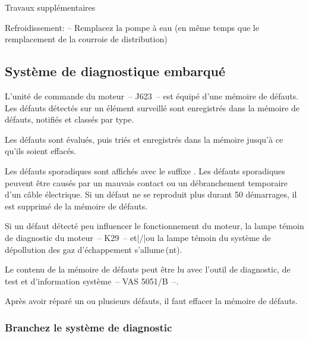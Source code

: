 

\stopsection

\startsection [title={Service régulier toutes les 4000\,h},
							reference={sec:main:4000},
							]


Travaux supplémentaires

Refroidissement:
– Remplacez la pompe à eau (en même temps que le remplacement de la courroie de distribution)









\startsection [title={Entretien du moteur diesel},
							reference={sec:workshop:vw},
							]


\subsection [sSec:vw:diagTool]{Système de diagnostique embarqué}

L’unité de commande du moteur~– J623~– est équipé d’une mémoire de défauts.
Les défauts détectés sur un élément surveillé sont enregistrés dans la mémoire de défauts,
notifiés et classés par type.

Les défauts sont évalués, puis triés et
enregistrés dans la mémoire jusqu’à ce qu’ils soient effacés.

Les défauts sporadiques sont affichés avec le suffixe .
Les défauts sporadiques peuvent être causés par un mauvais contact ou
un débranchement temporaire d’un câble électrique.
Si un défaut ne se reproduit plus durant 50 démarrages, il est supprimé
de la mémoire de défauts.

Si un défaut détecté peu influencer le fonctionnement du moteur,
la lampe témoin de diagnostic du moteur~– K29~– et|/|ou la lampe témoin du système
de dépollution des gaz d’échappement s’allume\,(nt).

Le contenu de la mémoire de défauts peut être lu avec l’outil de diagnostic, de test
et d’information système~– VAS 5051/B~–.

Après avoir réparé un ou plusieurs défauts, il faut effacer la
mémoire de défauts.

\subsubsection[sSec:vw:diagTool:connect]{Branchez le système de diagnostic}

